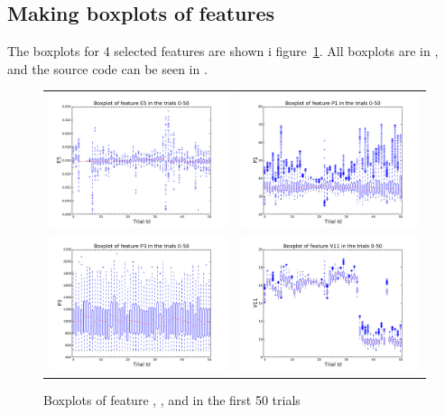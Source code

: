 \subsection{Making boxplots of features}
The boxplots for 4 selected features are shown i figure~\ref{fig:boxplots}. All boxplots are in , and the source code can be seen in . \par
\begin{figure}
    \begin{tabularx}{\textwidth}{ X X }
        \includegraphics[width=.5\textwidth]{../sessions/11-boxplots-scatterplots/plots/boxplots/E5-t0-t50.pdf} &
         \includegraphics[width=.5\textwidth]{../sessions/11-boxplots-scatterplots/plots/boxplots/P1-t0-t50.pdf}\\
        \includegraphics[width=.5\textwidth]{../sessions/11-boxplots-scatterplots/plots/boxplots/P3-t0-t50.pdf} &
         \includegraphics[width=.5\textwidth]{../sessions/11-boxplots-scatterplots/plots/boxplots/V11-t0-t50.pdf}
    \end{tabularx}
    \caption{Boxplots of feature , ,  and  in the first 50 trials}
    \label{fig:boxplots}
\end{figure}
